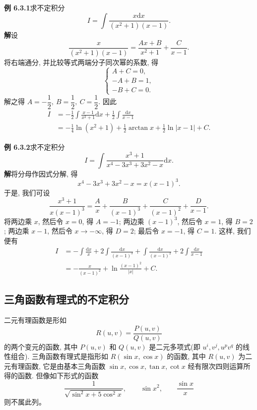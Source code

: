 \documentclass[UTF8, 12pt, fontset=fandol, oneside]{ctexart}
\begin{document}
\noindent\textbf{例 6.3.1}\quad 求不定积分
\[
  I=\int\frac{x\mathrm dx}{(x^2+1)(x-1)}.
\]
\noindent\textbf{解}\quad 设
\[
  \frac{x}{(x^2+1)(x-1)}
  =
  \frac{Ax+B}{x^2+1}+\frac C{x-1}.
\]
将右端通分, 并比较等式两端分子同次幂的系数, 得
\[
  \begin{cases}
    A+C=0,\\
    -A+B=1,\\
    -B+C=0.
  \end{cases}
\]
解之得 $A=-\dfrac12,\ B=\dfrac12,\ C=\dfrac12$. 因此
\[
\begin{aligned}
  I
  &=
  -\frac12\int\frac{x-1}{x^2+1}\mathrm dx+\frac12\int\frac{\mathrm dx}{x-1}\\
  &=
  -\frac14\ln(x^2+1)+\frac12\arctan x+\frac12\ln|x-1|+C.
\end{aligned}
\]

\noindent\textbf{例 6.3.2}\quad 求不定积分
\[
  I=\int\frac{x^3+1}{x^4-3x^3+3x^2-x}\mathrm dx.
\]
\noindent\textbf{解}\quad 将分母作因式分解, 得
\[
  x^4-3x^3+3x^2-x=x(x-1)^3.
\]
于是, 我们可设
\[
  \frac{x^3+1}{x(x-1)^3}
  =
  \frac Ax+\frac B{(x-1)^3}+\frac C{(x-1)^2}+\frac D{x-1}.
\]
将两边乘 $x$, 然后令 $x=0$, 得 $A=-1$; 两边乘 $(x-1)^3$, 然后令 $x=1$, 得 $B=2$; 两边乘 $x-1$, 然后令 $x\to-\infty$, 得 $D=2$; 最后令 $x=-1$, 得 $C=1$. 这样, 我们便有
\[
\begin{aligned}
  I
  &=
  -\int\frac{\mathrm dx}x+2\int\frac{\mathrm dx}{(x-1)^3}
  +\int\frac{\mathrm dx}{(x-1)^2}+2\int\frac{\mathrm dx}{x-1}\\
  &=
  -\frac{x}{(x-1)^2}+\ln\frac{(x-1)^2}{|x|}+C.
\end{aligned}
\]

\subsection{三角函数有理式的不定积分}

二元有理函数是形如
\[
  R(u,v)=\frac{P(u,v)}{Q(u,v)}
\]
的两个变元的函数, 其中 $P(u,v)$ 和 $Q(u,v)$ 是二元多项式(即 $u^i,v^j,u^pv^q$ 的线性组合). 三角函数有理式是指形如 $R(\sin x,\cos x)$ 的函数, 其中 $R(u,v)$ 为二元有理函数, 它是由基本三角函数 $\sin x,\cos x,\tan x,\cot x$ 经有限次四则运算所得的函数. 但像如下形式的函数
\[
  \frac1{\sqrt{\sin^2x+5\cos^2x}},\qquad
  \sin x^2,\qquad
  \frac{\sin x}{x}
\]
则不属此列。
\end{document}
